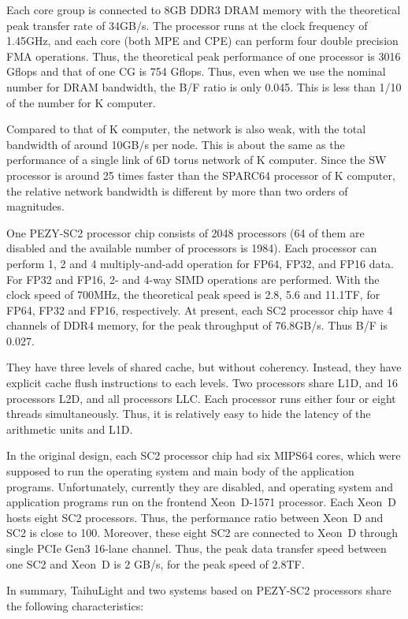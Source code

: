 \documentclass[conference]{IEEEtran}
\begin{document}
Each core group is connected to 8GB DDR3 DRAM memory with the theoretical
peak transfer rate of 34GB/s. The processor runs at the clock
frequency of 1.45GHz, and each core (both MPE and CPE) can perform
four double precision FMA operations. Thus, the theoretical peak
performance of one processor is 3016 Gflops and that of one CG is 754
Gflops. Thus, even when we use the nominal number for DRAM bandwidth,
the B/F ratio is only 0.045. This is less than 1/10 of the number for
K computer.

Compared to that of K computer, the network is also  weak,
with the total bandwidth of around 10GB/s per node. This is about the
same as the performance of a single link of 6D torus network of K
computer. Since the SW processor is around 25 times faster than the
SPARC64 processor of K computer, the relative network bandwidth is
different by  more than two orders of magnitudes.

One PEZY-SC2 processor chip consists of  2048 processors (64
of them are disabled and the available number of processors is
1984). Each processor can perform 1, 2 and 4 multiply-and-add
operation for FP64, FP32, and FP16 data. For FP32 and FP16, 2- and
4-way SIMD operations are performed.  With the clock speed of 700MHz,
the theoretical peak speed is 2.8, 5.6 and 11.1TF, for FP64, FP32 and
FP16, respectively. At present, each SC2 processor chip have 4 channels of
DDR4 memory, for the peak throughput of 76.8GB/s. Thus B/F is 0.027.

They have three levels of shared cache, but without
coherency. Instead, they have explicit cache flush instructions to each
levels. Two processors share L1D, and 16 processors L2D, and all
processors LLC. Each processor runs either four or eight threads
simultaneously. Thus, it is relatively easy to hide the  latency of
the arithmetic units and L1D.

In the original design, each SC2 processor chip had six MIPS64 cores,
which were supposed to run the operating system and main body of the
application programs. Unfortunately, currently they are disabled, and
operating system and application programs run on the frontend  Xeon~D-1571
processor. Each Xeon~D  hosts eight SC2 processors. Thus, the
performance ratio between Xeon~D and SC2 is close to 100.
Moreover, these eight SC2 are connected to Xeon~D through single PCIe
Gen3 16-lane channel. Thus, the peak data transfer speed between one
SC2 and Xeon~D is 2 GB/s, for the peak speed of 2.8TF.


%
In summary, TaihuLight and two systems based on PEZY-SC2 processors  share the following
characteristics:
\end{document}
